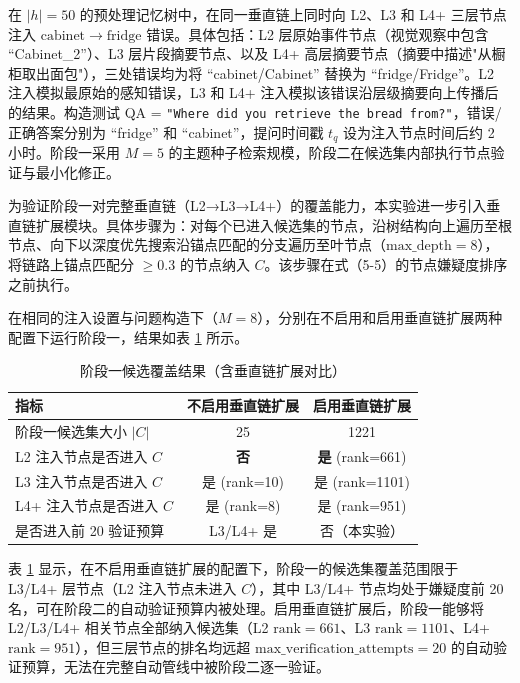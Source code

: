 在 $|h|=50$ 的预处理记忆树中，在同一垂直链上同时向 L2、L3 和 L4+ 三层节点注入 $\mathrm{cabinet} \rightarrow \mathrm{fridge}$ 错误。具体包括：L2 层原始事件节点（视觉观察中包含 “Cabinet\_2”）、L3 层片段摘要节点、以及 L4+ 高层摘要节点（摘要中描述"从橱柜取出面包"），三处错误均为将 “cabinet/Cabinet” 替换为 “fridge/Fridge”。L2 注入模拟最原始的感知错误，L3 和 L4+ 注入模拟该错误沿层级摘要向上传播后的结果。构造测试 QA = \texttt{"Where did you retrieve the bread from?"}，错误/正确答案分别为 “fridge” 和 “cabinet”，提问时间戳 $t_q$ 设为注入节点时间后约 2 小时。阶段一采用 $M=5$ 的主题种子检索规模，阶段二在候选集内部执行节点验证与最小化修正。

为验证阶段一对完整垂直链（L2→L3→L4+）的覆盖能力，本实验进一步引入垂直链扩展模块。具体步骤为：对每个已进入候选集的节点，沿树结构向上遍历至根节点、向下以深度优先搜索沿锚点匹配的分支遍历至叶节点（$\mathrm{max\_depth}=8$），将链路上锚点匹配分 $\ge 0.3$ 的节点纳入 $C$。该步骤在式（5-5）的节点嫌疑度排序之前执行。

在相同的注入设置与问题构造下（$M=8$），分别在不启用和启用垂直链扩展两种配置下运行阶段一，结果如表 \ref{tab:5-1} 所示。

\begin{table}[htbp]
\centering
\caption{阶段一候选覆盖结果（含垂直链扩展对比）}
\label{tab:5-1}
\begin{tabular}{lcc}
\toprule
指标 & 不启用垂直链扩展 & 启用垂直链扩展 \\
\midrule
阶段一候选集大小 $|C|$ & 25 & 1221 \\
L2 注入节点是否进入 $C$ & \textbf{否} & \textbf{是} (rank=661) \\
L3 注入节点是否进入 $C$ & 是 (rank=10) & 是 (rank=1101) \\
L4+ 注入节点是否进入 $C$ & 是 (rank=8) & 是 (rank=951) \\
是否进入前 20 验证预算 & L3/L4+ 是 & 否（本实验） \\
\bottomrule
\end{tabular}
\end{table}

表 \ref{tab:5-1} 显示，在不启用垂直链扩展的配置下，阶段一的候选集覆盖范围限于 L3/L4+ 层节点（L2 注入节点未进入 $C$），其中 L3/L4+ 节点均处于嫌疑度前 20 名，可在阶段二的自动验证预算内被处理。启用垂直链扩展后，阶段一能够将 L2/L3/L4+ 相关节点全部纳入候选集（L2 $\mathrm{rank}=661$、L3 $\mathrm{rank}=1101$、L4+ $\mathrm{rank}=951$），但三层节点的排名均远超 $\mathrm{max\_verification\_attempts}=20$ 的自动验证预算，无法在完整自动管线中被阶段二逐一验证。

